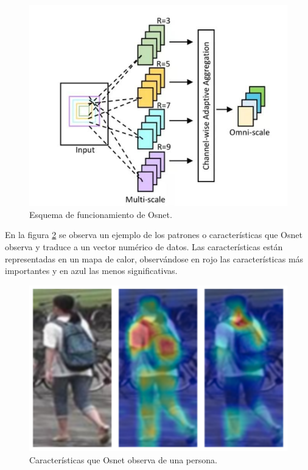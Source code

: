 \begin{figure}[ht]
	\centering
	\includegraphics[scale=.60]{./Figures/osnet.jpg}
	\caption{Esquema de funcionamiento de Osnet\protect\footnotemark.}
	\label{fig:osnet}
\end{figure}


\newpage

En la figura \ref{fig:osnetFeatureMap} se observa un ejemplo de los patrones o características que Osnet observa y traduce a un vector numérico de datos. Las características están representadas en un mapa de calor, observándose en rojo las características más importantes y en azul las menos significativas.

\begin{figure}[ht]
	\centering
	\includegraphics[scale=.60]{./Figures/osnetFeatureMap.png}
	\caption{Características que Osnet observa de una persona\protect\footnotemark.}
	\label{fig:osnetFeatureMap}
\end{figure}

